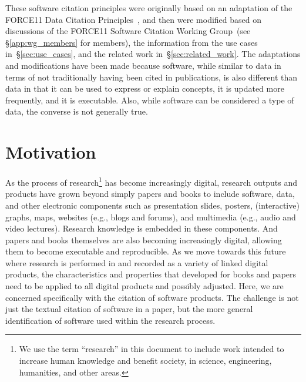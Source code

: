 \documentclass[11pt, oneside]{amsart}
\newcommand{\katznote}[1]{ {\textcolor{blue} { ***DSK: #1 }}} %
\begin{document}
These software citation principles were originally based on an adaptation of the
FORCE11 Data Citation Principles~\cite{data-citation-principles}, and then were
modified based on discussions of the FORCE11 Software Citation Working
Group~(see \S\ref{app:wg_members} for members), the information from the use
cases in~\S\ref{sec:use_cases}, and the related work in~\S\ref{sec:related_work}.
The adaptations and modifications have been made
because software, while similar to data in terms of not traditionally having
been cited in publications, is also different than data in that it can be used
to express or explain concepts, it is updated more frequently, and it is
executable.
Also, while software can be considered a type of data, the converse is not
generally true.




\section{Motivation}
\label{sec:intro}

As the process of research\footnote{We use the term ``research'' in this document to include work intended to increase human knowledge and benefit society, in science, engineering, humanities, and other areas.} has become increasingly digital, research outputs
and products have grown beyond simply papers and books to include software,
data, and other electronic components such as presentation slides, posters,
(interactive)  graphs, maps, websites (e.g., blogs and forums), and multimedia
(e.g., audio and  video lectures).  Research knowledge is embedded in these
components. And papers and books themselves are also becoming increasingly
digital, allowing them to become executable and reproducible. As we move towards
this future where research is performed in and recorded as a variety of linked
digital products, the characteristics and properties that developed for books
and papers need to be applied to all digital products and possibly adjusted.
Here, we are concerned specifically with the citation of software products. The
challenge is not just the textual citation of software in a paper, but the more
general identification of software used within the research process.
\end{document}
